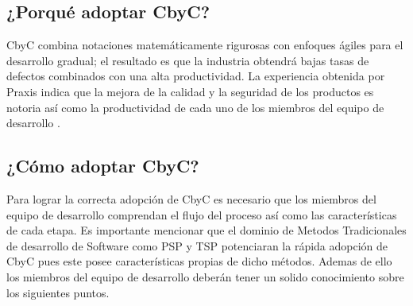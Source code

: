 \documentclass[runningheads,a4paper]{llncs}
\begin{document}
\subsection{¿Porqué adoptar \gls{CbyC}?}
CbyC combina notaciones matemáticamente rigurosas con enfoques ágiles para el desarrollo gradual; el resultado es que la industria obtendrá bajas tasas de defectos combinados con una alta productividad.
La experiencia obtenida por \gls{Praxis} indica que la mejora de la calidad y la seguridad de los productos es notoria así como la productividad de cada uno de los miembros del equipo de desarrollo \cite{CbyCIntroduction}.

\subsection{¿Cómo adoptar \gls{CbyC}?}
Para lograr la correcta adopción de \gls{CbyC} es necesario que los miembros del equipo de desarrollo comprendan el flujo del proceso así como las características de cada etapa. Es importante mencionar que el dominio de \gls{Metodos Tradicionales} de desarrollo de \gls{Software} como \gls{PSP} y \gls{TSP} potenciaran la rápida adopción de \gls{CbyC} pues este posee características propias de dicho métodos. Ademas de ello los miembros del equipo de desarrollo deberán tener un solido conocimiento sobre los siguientes puntos. 
\end{document}
